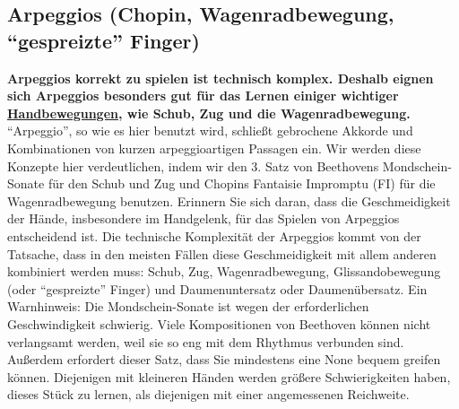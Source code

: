 
\hypertarget{c1iii5e}{}
\subsection{Arpeggios (Chopin, Wagenradbewegung, \enquote{gespreizte} Finger)}\hypertarget{Arpeggios}{}

\textbf{Arpeggios korrekt zu spielen ist technisch komplex.
Deshalb eignen sich Arpeggios besonders gut für das Lernen einiger wichtiger \hyperlink{c1iii4}{Handbewegungen}, wie Schub, Zug und die Wagenradbewegung.}
\enquote{Arpeggio}, so wie es hier benutzt wird, schließt gebrochene Akkorde und Kombinationen von kurzen arpeggioartigen Passagen ein.
Wir werden diese Konzepte hier verdeutlichen, indem wir den 3. Satz von Beethovens Mondschein-Sonate für den Schub und Zug und Chopins Fantaisie Impromptu (FI) für die Wagenradbewegung benutzen.
Erinnern Sie sich daran, dass die Geschmeidigkeit der Hände, insbesondere im Handgelenk, für das Spielen von Arpeggios entscheidend ist.
Die technische Komplexität der Arpeggios kommt von der Tatsache, dass in den meisten Fällen diese Geschmeidigkeit mit allem anderen kombiniert werden muss: Schub, Zug, Wagenradbewegung, Glissandobewegung (oder \enquote{gespreizte} Finger) und Daumenuntersatz oder Daumenübersatz.
Ein Warnhinweis: Die Mondschein-Sonate ist wegen der erforderlichen Geschwindigkeit schwierig.
Viele Kompositionen von Beethoven können nicht verlangsamt werden, weil sie so eng mit dem Rhythmus verbunden sind.
Außerdem erfordert dieser Satz, dass Sie mindestens eine None bequem greifen können.
Diejenigen mit kleineren Händen werden größere Schwierigkeiten haben, dieses Stück zu lernen, als diejenigen mit einer angemessenen Reichweite.

